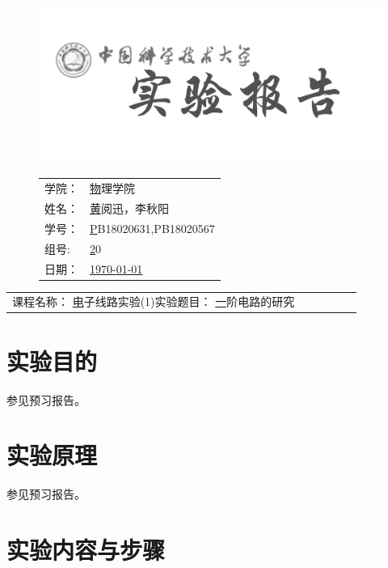 \documentclass[a4paper,11pt,UTF8]{ctexart}
\newcommand{\major}{物理学院}
\newcommand{\name}{黄阅迅，李秋阳}
\newcommand{\stuid}{PB18020631,PB18020567}
\newcommand{\group}{20}
\newcommand{\newdate}{\today}
\newcommand{\course}{电子线路实验(1)}
\newcommand{\newtitle}{一阶电路的研究}
\begin{document}
\thispagestyle{empty}
\begin{figure}[h]
  \begin{minipage}{0.6\linewidth}
    \centerline{\includegraphics[width=\linewidth]{logo.png}}
  \end{minipage}
  \hfill
  \begin{minipage}{.4\linewidth}
    \raggedleft
    \begin{tabular*}{.8\linewidth}{ll}
      学院： & \underline\major   \\
      姓名： & \underline\name    \\
      学号： & \underline\stuid   \\
      组号:  & \underline\group   \\
      日期： & \underline\newdate \\
    \end{tabular*}
  \end{minipage}
\end{figure}

\begin{table}[!htbp]
  \centering
  \begin{tabular*}{\linewidth}{llllll}
    课程名称：  \underline\course   \qquad\qquad 实验题目：  \underline\newtitle  
  \end{tabular*}
\end{table}


\section{实验目的}
参见预习报告。
\section{实验原理}
参见预习报告。
\section{实验内容与步骤}
\end{document}
